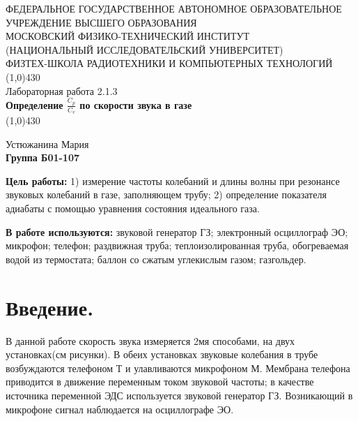 \documentclass[11pt]{article}
\begin{document}
\begin{titlepage}
\begin{center}
\large{\small ФЕДЕРАЛЬНОЕ ГОСУДАРСТВЕННОЕ АВТОНОМНОЕ ОБРАЗОВАТЕЛЬНОЕ\\ УЧРЕЖДЕНИЕ ВЫСШЕГО ОБРАЗОВАНИЯ\\ МОСКОВСКИЙ ФИЗИКО-ТЕХНИЧЕСКИЙ ИНСТИТУТ\\ (НАЦИОНАЛЬНЫЙ ИССЛЕДОВАТЕЛЬСКИЙ УНИВЕРСИТЕТ)\\ ФИЗТЕХ-ШКОЛА РАДИОТЕХНИКИ И КОМПЬЮТЕРНЫХ ТЕХНОЛОГИЙ}
\vfill
\line(1,0){430}\\[1mm]
\huge{Лабораторная работа 2.1.3}\\
\huge\textbf{Определение $\frac{C_p}{C_v}$ по скорости звука в газе}\\
\line(1,0){430}\\[1mm]
\vfill
\begin{flushright}
\normalsize{Устюжанина Мария}\\
\normalsize{\textbf{Группа Б01-107}}\\
\end{flushright}
\end{center}
\end{titlepage}



\par \textbf{Цель работы:} 1) измерение частоты колебаний и длины волны при резонансе звуковых колебаний в газе, заполняющем трубу; 2) определение показателя адиабаты с помощью уравнения состояния идеального газа.

\par \textbf{В работе используются:} звуковой генератор ГЗ; электронный осциллограф ЭО; микрофон; телефон; раздвижная труба; теплоизолированная труба, обогреваемая водой из термостата; баллон со сжатым углекислым газом; газгольдер.

\section{Введение.}

В данной работе скорость звука измеряется 2мя способами, на двух установках(см рисунки). В обеих установках звуковые колебания в трубе возбуждаются телефоном Т и улавливаются микрофоном М. Мембрана телефона приводится в движение переменным током звуковой частоты; в качестве источника переменной ЭДС используется звуковой генератор ГЗ. Возникающий в микрофоне сигнал наблюдается на осциллографе ЭО.
\end{document}
